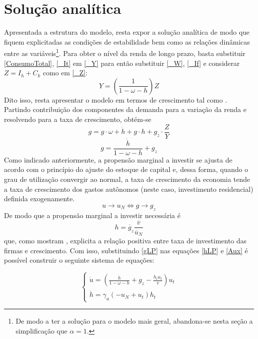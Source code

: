 \section{Solução analítica}
\label{SecAnalitica}

Apresentada a estrutura do modelo, resta expor a solução analítica de modo que fiquem explicitadas as condições de estabilidade bem como as relações dinâmicas entre as variáveis\footnote{De modo a ter a solução para o modelo mais geral, abandona-se nesta seção a simplificação que $\alpha=1$.}. Para obter o nível da renda de longo prazo, basta substituir \ref{ConsumoTotal}, \ref{_It} em \ref{_Y} para então substituir \ref{_W}, \ref{_If} e considerar $Z = I_h + C_k$ como em \ref{_Z}:
\begin{equation}
    \label{AnaliticaNivel}
    Y = \left(\frac{1}{1-\omega - h}\right)Z
\end{equation}
Dito isso, resta apresentar o modelo em termos de crescimento tal como \textcite{freitas_growth_2015}. Partindo contribuição dos componentes da demanda para a variação da renda e resolvendo para a taxa de crescimento, obtém-se
$$
g = g\cdot \omega + \dot h + g\cdot h + g_z\cdot \frac{Z}{Y}
$$
\begin{equation}
\label{gLP}
    g = \frac{\dot h}{1 - \omega - h} + g_z
\end{equation}
Como indicado anteriormente, a propensão marginal a investir se ajusta de acordo com o princípio do ajuste do estoque de capital e, dessa forma, quando o grau de utilização convergir ao normal, a taxa de crescimento da economia tende a taxa de crescimento dos gastos autônomos (neste caso, investimento residencial) definida exogenamente. 
\begin{equation}
u \to u_N \Leftrightarrow g \to g_z
\end{equation}
De modo que a propensão marginal a investir necessária é
\begin{equation}
\label{hLP}
h = \overline g_z\frac{\overline v}{\overline u_N}
\end{equation}
que, como mostram \textcite{fagundes_role_2017}, explicita a relação positiva entre taxa de investimento das firmas e crescimento. Com isso, substituindo \ref{gLP} nas equações \ref{hLP} e \ref{Aux} é possível construir o seguinte sistema de equações:

$$
\begin{cases}
\dot u = \left(\frac{\dot h}{1 - \omega - h} + g_z - \frac{h_t u_t}{v}\right) u_t\\
\dot h = \gamma_{u} \left(- u_N + u_t\right) h_t
\end{cases}
$$

